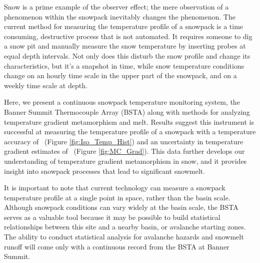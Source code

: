 Snow is a prime example of the observer effect; the mere observation of a phenomenon within the snowpack inevitably changes the phenomenon. The current method for measuring the temperature profile of a snowpack is a time consuming, destructive process that is not automated. It requires someone to dig a snow pit and manually measure the snow temperature by inserting probes at equal depth intervals. Not only does this disturb the snow profile and change its characteristics, but it’s a snapshot in time, while snow temperature conditions change on an hourly time scale in the upper part of the snowpack, and on a weekly time scale at depth.

Here, we present a continuous snowpack temperature monitoring system, the Banner Summit Thermocouple Array (BSTA) along with methods for analyzing temperature gradient metamorphism and melt. Results suggest this instrument is successful at measuring the temperature profile of a snowpack with a temperature accuracy of \isostd \ (Figure \ref{fig:Iso_Temp_Hist}) and an uncertainty in temperature gradient estimates of \gradstd \ (Figure \ref{fig:MC_Grad}). This data further develops our understanding of temperature gradient metamorphism in snow, and it provides insight into snowpack processes that lead to significant snowmelt.

It is important to note that current technology can measure a snowpack temperature profile at a single point in space, rather than the basin scale. Although snowpack conditions can vary widely at the basin scale, the BSTA serves as a valuable tool because it may be possible to build statistical relationships between this site and a nearby basin, or avalanche starting zones. The ability to conduct statistical analysis for avalanche hazards and snowmelt runoff will come only with a continuous record from the BSTA at Banner Summit.  